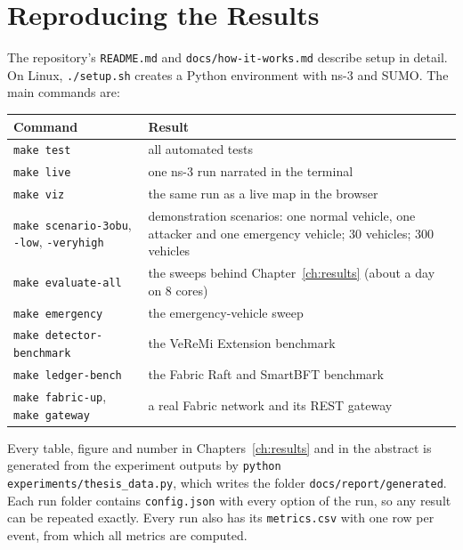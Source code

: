 \chapter{Reproducing the Results}\label{app:repro}

The repository's \texttt{README.md} and \texttt{docs/how-it-works.md} describe setup in detail. On
Linux, \texttt{./setup.sh} creates a Python environment with ns-3 and SUMO. The main commands are:

\begin{center}\small
\begin{tabular}{@{}lp{9.5cm}@{}}
\toprule
Command & Result \\
\midrule
\texttt{make test} & all automated tests \\
\texttt{make live} & one ns-3 run narrated in the terminal \\
\texttt{make viz} & the same run as a live map in the browser \\
\texttt{make scenario-3obu}, \texttt{-low}, \texttt{-veryhigh} & demonstration scenarios: one normal vehicle, one attacker and one emergency vehicle; 30 vehicles; 300 vehicles \\
\texttt{make evaluate-all} & the sweeps behind Chapter~\ref{ch:results} (about a day on 8 cores) \\
\texttt{make emergency} & the emergency-vehicle sweep \\
\texttt{make detector-benchmark} & the VeReMi Extension benchmark \\
\texttt{make ledger-bench} & the Fabric Raft and SmartBFT benchmark \\
\texttt{make fabric-up}, \texttt{make gateway} & a real Fabric network and its REST gateway \\
\bottomrule
\end{tabular}
\end{center}

Every table, figure and number in Chapters~\ref{ch:results} and in the abstract is generated from
the experiment outputs by \texttt{python experiments/thesis\_data.py}, which writes the folder
\texttt{docs/report/generated}. Each run folder contains \texttt{config.json} with every option of the
run, so any result can be repeated exactly. Every run also has its \texttt{metrics.csv} with one row per
event, from which all metrics are computed.
